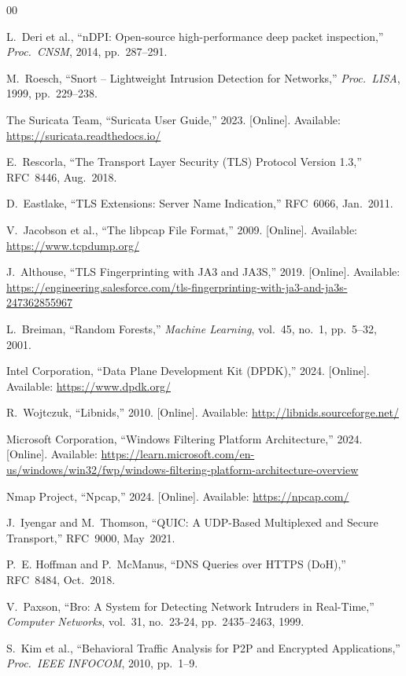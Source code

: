 \documentclass[conference]{IEEEtran}
\begin{document}
\begin{thebibliography}{00}

L.~Deri et al., ``nDPI: Open-source high-performance deep packet inspection,''
\textit{Proc.\ CNSM}, 2014, pp.~287--291.

M.~Roesch, ``Snort -- Lightweight Intrusion Detection for Networks,''
\textit{Proc.\ LISA}, 1999, pp.~229--238.

The Suricata Team, ``Suricata User Guide,'' 2023. [Online].
Available: \url{https://suricata.readthedocs.io/}

E.~Rescorla, ``The Transport Layer Security (TLS) Protocol Version 1.3,''
RFC~8446, Aug.~2018.

D.~Eastlake, ``TLS Extensions: Server Name Indication,''
RFC~6066, Jan.~2011.

V.~Jacobson et al., ``The libpcap File Format,'' 2009. [Online].
Available: \url{https://www.tcpdump.org/}

J.~Althouse, ``TLS Fingerprinting with JA3 and JA3S,'' 2019. [Online].
Available: \url{https://engineering.salesforce.com/tls-fingerprinting-with-ja3-and-ja3s-247362855967}

L.~Breiman, ``Random Forests,''
\textit{Machine Learning}, vol.~45, no.~1, pp.~5--32, 2001.

Intel Corporation, ``Data Plane Development Kit (DPDK),'' 2024. [Online].
Available: \url{https://www.dpdk.org/}

R.~Wojtczuk, ``Libnids,'' 2010. [Online].
Available: \url{http://libnids.sourceforge.net/}

Microsoft Corporation, ``Windows Filtering Platform Architecture,'' 2024.
[Online]. Available: \url{https://learn.microsoft.com/en-us/windows/win32/fwp/windows-filtering-platform-architecture-overview}

Nmap Project, ``Npcap,'' 2024. [Online]. Available: \url{https://npcap.com/}

J.~Iyengar and M.~Thomson, ``QUIC: A UDP-Based Multiplexed and Secure
Transport,'' RFC~9000, May~2021.

P.~E. Hoffman and P.~McManus, ``DNS Queries over HTTPS (DoH),''
RFC~8484, Oct.~2018.

V.~Paxson, ``Bro: A System for Detecting Network Intruders in Real-Time,''
\textit{Computer Networks}, vol.~31, no.~23-24, pp.~2435--2463, 1999.

S.~Kim et al., ``Behavioral Traffic Analysis for P2P and Encrypted
Applications,'' \textit{Proc.\ IEEE INFOCOM}, 2010, pp.~1--9.

\end{thebibliography}
\end{document}
